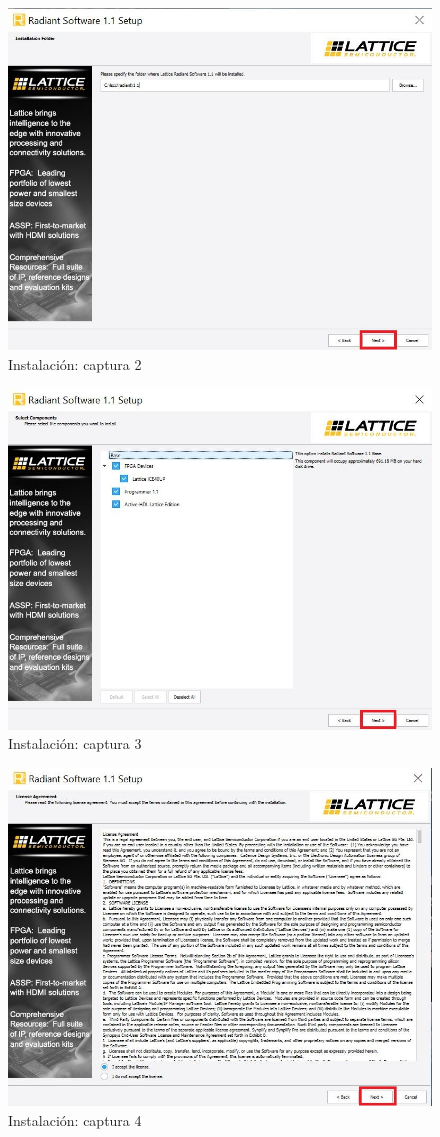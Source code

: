 \documentclass{article}
\begin{document}
\begin{figure}[H]
\centering
\includegraphics[width=0.8\linewidth]{Imagenes/inst2.JPG}
\caption{Instalación: captura 2 }
\label{fig:install}
\end{figure}

\begin{figure}[H]
\centering
\includegraphics[width=0.8\linewidth]{Imagenes/inst3.JPG}
\caption{Instalación: captura 3 }
\label{fig:install}
\end{figure}

\begin{figure}[H]
\centering
\includegraphics[width=0.8\linewidth]{Imagenes/inst4.JPG}
\caption{Instalación: captura 4 }
\label{fig:install}
\end{figure}
\end{document}
